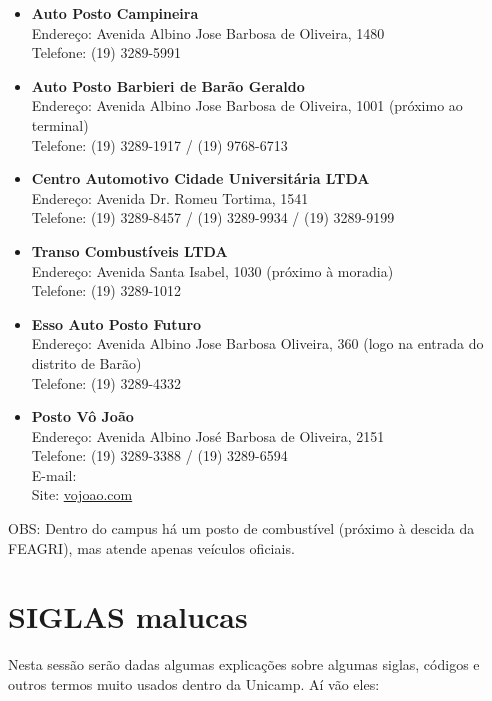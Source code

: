 \begin{itemize}
\item   \textbf{Auto Posto Campineira}
		\\Endereço: Avenida Albino Jose Barbosa de Oliveira, 1480
		\\Telefone: (19) 3289-5991

\item   \textbf{Auto Posto Barbieri de Barão Geraldo}
		\\Endereço: Avenida Albino Jose Barbosa de Oliveira, 1001 (próximo ao terminal)
		\\Telefone: (19) 3289-1917 / (19) 9768-6713

\item   \textbf{Centro Automotivo Cidade Universitária LTDA}
		\\Endereço: Avenida Dr. Romeu Tortima, 1541
		\\Telefone: (19) 3289-8457 / (19) 3289-9934 / (19) 3289-9199

\item   \textbf{Transo Combustíveis LTDA}
		\\Endereço: Avenida Santa Isabel, 1030 (próximo à moradia)
		\\Telefone: (19) 3289-1012

\item   \textbf{Esso Auto Posto Futuro}
		\\Endereço: Avenida Albino Jose Barbosa Oliveira, 360 (logo na entrada do distrito de Barão)
		\\Telefone: (19) 3289-4332

\item   \textbf{Posto Vô João}
		\\Endereço: Avenida Albino José Barbosa de Oliveira, 2151
		\\Telefone: (19) 3289-3388 / (19) 3289-6594
        \\E-mail: 
		\\Site: \url{vojoao.com}
\end{itemize}

OBS: Dentro do campus há um posto de combustível (próximo à descida da FEAGRI),
mas atende apenas veículos oficiais.

\twocolumn
\section{SIGLAS malucas}

Nesta sessão serão dadas algumas explicações sobre algumas siglas, códigos
e outros termos muito usados dentro da Unicamp. Aí vão eles:


